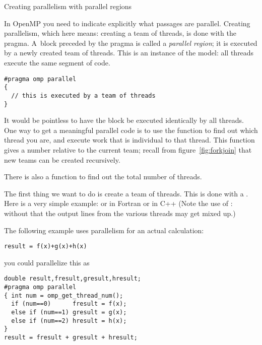 

 {Creating parallelism with parallel regions}

In OpenMP you need to indicate explicitly what passages are
parallel. Creating parallelism, which here means: creating a team of threads,
is done with the  pragma.
A~block preceded by the  pragma
is called a \emph{parallel region}; it
is executed by a newly created team of threads. 
This is an instance of the  model: all threads execute the same
segment of code.
\begin{lstlisting}
#pragma omp parallel
{
  // this is executed by a team of threads
}
\end{lstlisting}

It would be pointless to have the block be executed identically by
all threads.
One way to get a meaningful parallel code is to use the function
 to find out which thread you are,
and execute work that is individual to that thread.
This function gives a number relative to the current team;
recall from figure~\ref{fig:forkjoin} that new teams can be created recursively.

There is also a function
 to find out the total number of threads.

The first thing we want to do is create a team of threads. This
is done with a .
Here is a very simple example:
or in Fortran
or in C++
(Note the use of : without that
the output lines from the various threads may get mixed up.)

The following example uses parallelism for an actual calculation:
\begin{lstlisting}
result = f(x)+g(x)+h(x)
\end{lstlisting}
you could parallelize this as
\begin{lstlisting}
double result,fresult,gresult,hresult;
#pragma omp parallel
{ int num = omp_get_thread_num();
  if (num==0)      fresult = f(x);
  else if (num==1) gresult = g(x);
  else if (num==2) hresult = h(x);
}
result = fresult + gresult + hresult;
\end{lstlisting}

